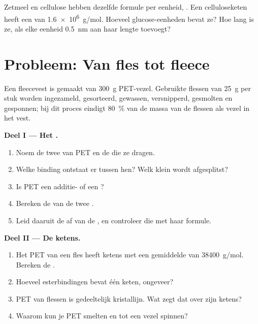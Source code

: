 \begin{exercise}[$\star\star\star$]\label{exo:g12:polymers:15}
Zetmeel en cellulose hebben dezelfde formule per eenheid, .
Een celluloseketen heeft een  van \qty{1.6e6}{g/mol}. Hoeveel
glucose-eenheden bevat ze? Hoe lang is ze, als elke eenheid
\qty{0.5}{nm} aan haar lengte toevoegt?
\end{exercise}

\section{Probleem: Van fles tot fleece}

\begin{problem}
\label{pb:g12:polymers:1}
Een fleecevest is gemaakt van \qty{300}{g} PET-vezel. Gebruikte flessen
van \qty{25}{g} per stuk worden ingezameld, gesorteerd, gewassen,
versnipperd, gesmolten en gesponnen; bij dit proces eindigt
\qty{80}{\percent} van de massa van de flessen als vezel in het vest.

\medskip
\noindent\textbf{Deel I --- Het .}
\begin{enumerate}
  \item Noem de twee  van PET en de  die
        ze dragen.
  \item Welke binding ontstaat er tussen hen? Welk klein  wordt
        afgesplitst?
  \item Is PET een additie- of een ?
  \item Bereken de  van de twee .
  \item Leid daaruit de  af van de 
        , en controleer die met haar formule.
\end{enumerate}

\medskip
\noindent\textbf{Deel II --- De ketens.}
\begin{enumerate}[resume]
  \item Het PET van een fles heeft ketens met een gemiddelde  van \qty{38400}{g/mol}. Bereken de .
  \item Hoeveel esterbindingen bevat één keten, ongeveer?
  \item PET van flessen is gedeeltelijk kristallijn. Wat zegt dat over
        zijn ketens?
  \item Waarom kun je PET smelten en tot een vezel spinnen?
\end{enumerate}


\end{problem}
